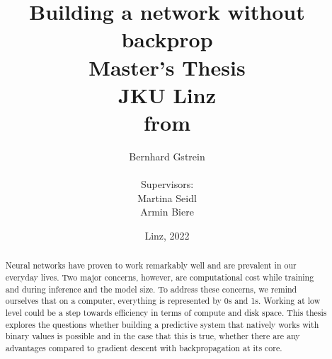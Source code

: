 \documentclass[a4paper,12pt]{article}
\begin{document}
\usetikzlibrary{patterns}

%
    \title{Building a network without backprop\\
    \vspace{2em}
    Master's Thesis\\
    \vspace{2em}
    JKU Linz\\
    \vspace{1.5em}
    from}

    \author{
 	\LARGE Bernhard Gstrein\\
 	\vspace{.5em} \\
 	Supervisors:\\
 	Martina Seidl\\
 	Armin Biere\\
 	\vspace{1em}
	}
    
\date{Linz, 2022}

\maketitle
   
\begin{abstract}
\noindent Neural networks have proven to work remarkably well and are prevalent in our everyday lives. Two major concerns, however, are computational cost while training and during inference and the model size. To address these concerns, we remind ourselves that on a computer, everything is represented by 0s and 1s. Working at low level could be a step towards efficiency in terms of compute and disk space. This thesis explores the questions whether building a predictive system that natively works with binary values is possible and in the case that this is true, whether there are any advantages compared to gradient descent with backpropagation at its core.
\end{abstract}
   
\newpage
   
\tableofcontents
 
\newpage
    










\end{document}
